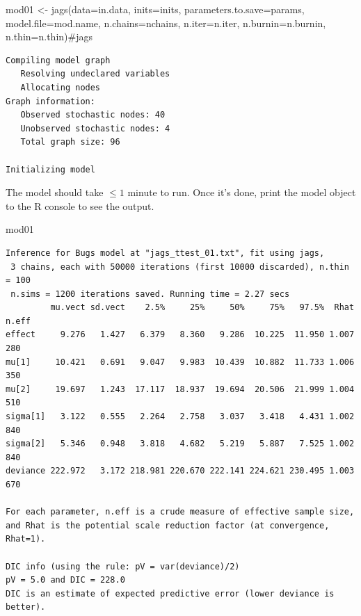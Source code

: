 \documentclass[
  13,
  letterpaper,
]{report}
\newenvironment{Shaded}{\begin{snugshade}}{\end{snugshade}}
\newcommand{\AttributeTok}[1]{\textcolor[rgb]{0.40,0.45,0.13}{#1}}
\newcommand{\CommentTok}[1]{\textcolor[rgb]{0.37,0.37,0.37}{#1}}
\newcommand{\FunctionTok}[1]{\textcolor[rgb]{0.28,0.35,0.67}{#1}}
\newcommand{\NormalTok}[1]{\textcolor[rgb]{0.00,0.23,0.31}{#1}}
\newcommand{\OtherTok}[1]{\textcolor[rgb]{0.00,0.23,0.31}{#1}}
\begin{document}
\begin{Shaded}
\begin{Highlighting}[]
\NormalTok{mod01 }\OtherTok{\textless{}{-}} \FunctionTok{jags}\NormalTok{(}\AttributeTok{data=}\NormalTok{in.data, }\AttributeTok{inits=}\NormalTok{inits,}
              \AttributeTok{parameters.to.save=}\NormalTok{params,}
              \AttributeTok{model.file=}\NormalTok{mod.name,}
              \AttributeTok{n.chains=}\NormalTok{nchains, }\AttributeTok{n.iter=}\NormalTok{n.iter,}
              \AttributeTok{n.burnin=}\NormalTok{n.burnin, }\AttributeTok{n.thin=}\NormalTok{n.thin)}\CommentTok{\#jags}
\end{Highlighting}
\end{Shaded}

\begin{verbatim}
Compiling model graph
   Resolving undeclared variables
   Allocating nodes
Graph information:
   Observed stochastic nodes: 40
   Unobserved stochastic nodes: 4
   Total graph size: 96

Initializing model
\end{verbatim}

The model should take \(\leq1\) minute to run. Once it's done, print the
model object to the R console to see the output.

\begin{Shaded}
\begin{Highlighting}[]
\NormalTok{mod01}
\end{Highlighting}
\end{Shaded}

\begin{verbatim}
Inference for Bugs model at "jags_ttest_01.txt", fit using jags,
 3 chains, each with 50000 iterations (first 10000 discarded), n.thin = 100
 n.sims = 1200 iterations saved. Running time = 2.27 secs
         mu.vect sd.vect    2.5%     25%     50%     75%   97.5%  Rhat n.eff
effect     9.276   1.427   6.379   8.360   9.286  10.225  11.950 1.007   280
mu[1]     10.421   0.691   9.047   9.983  10.439  10.882  11.733 1.006   350
mu[2]     19.697   1.243  17.117  18.937  19.694  20.506  21.999 1.004   510
sigma[1]   3.122   0.555   2.264   2.758   3.037   3.418   4.431 1.002   840
sigma[2]   5.346   0.948   3.818   4.682   5.219   5.887   7.525 1.002   840
deviance 222.972   3.172 218.981 220.670 222.141 224.621 230.495 1.003   670

For each parameter, n.eff is a crude measure of effective sample size,
and Rhat is the potential scale reduction factor (at convergence, Rhat=1).

DIC info (using the rule: pV = var(deviance)/2)
pV = 5.0 and DIC = 228.0
DIC is an estimate of expected predictive error (lower deviance is better).
\end{verbatim}
\end{document}
